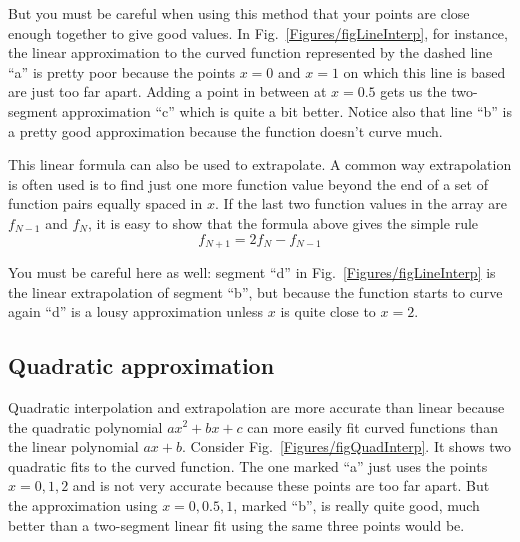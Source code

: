 But you must be careful when using this method that your points are
close enough together to give good values. In
Fig.~\ref{Figures/figLineInterp}, for instance, the linear approximation to
the curved function represented by the dashed line ``a'' is pretty
poor because the points $x=0$ and $x=1$ on which this line is based
are just too far apart. Adding a point in between at $x=0.5$ gets
us the two-segment approximation ``c'' which is quite a bit better.
Notice also that line ``b'' is a pretty good approximation because
the function doesn't curve much.

This linear formula can also be used to extrapolate. A common way
extrapolation is often used is to find just one more function value
beyond the end of a set of function pairs equally spaced in $x$. If
the last two function values in the array are $f_{N-1}$ and $f_N$,
it is easy to show that the formula above gives the simple rule
\begin{equation}\label{eq:linExtrap}
f_{N+1} = 2 f_N-f_{N-1}
\end{equation}

You must be careful here as well: segment ``d'' in Fig.~\ref{Figures/figLineInterp}
is the linear extrapolation of segment ``b'', but because the
function starts to curve again ``d'' is a lousy approximation unless
$x$ is quite close to $x=2$.



\subsection*{Quadratic approximation}
Quadratic interpolation and extrapolation are more accurate than
linear because the quadratic polynomial $a x^2 + bx + c$ can more
easily fit curved functions than the linear polynomial $ax + b$.
Consider Fig.~\ref{Figures/figQuadInterp}. It shows two quadratic fits to the curved
function. The one marked ``a'' just uses the points $x=0,1,2$ and is
not very accurate because these points are too far apart. But the
approximation using $x=0,0.5,1$, marked ``b'', is really quite good,
much better than a two-segment linear fit using the same three
points would be.


